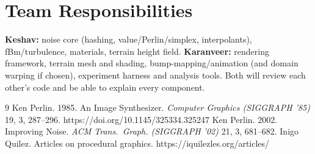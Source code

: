\documentclass[acmlarge,nonacm]{acmart}
\begin{document}
\section{Team Responsibilities}\label{sec:team}
\textbf{Keshav:} noise core (hashing, value/Perlin/simplex, interpolants), fBm/turbulence, materials, terrain height field. \textbf{Karanveer:} rendering framework, terrain mesh and shading, bump-mapping/animation (and domain warping if chosen), experiment harness and analysis tools. Both will review each other's code and be able to explain every component.

\begin{thebibliography}{9}
 Ken Perlin. 1985. An Image Synthesizer. \emph{Computer Graphics (SIGGRAPH '85)} 19, 3, 287--296. https://doi.org/10.1145/325334.325247
 Ken Perlin. 2002. Improving Noise. \emph{ACM Trans.\ Graph. (SIGGRAPH '02)} 21, 3, 681--682.
 Inigo Quilez. Articles on procedural graphics. https://iquilezles.org/articles/
\end{thebibliography}
\end{document}
